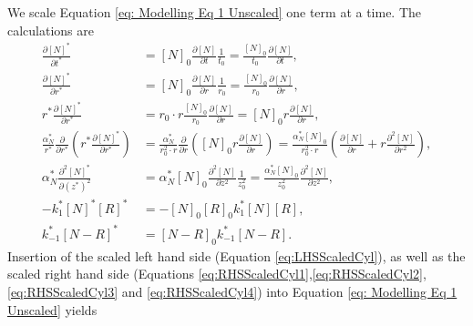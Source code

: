 \documentclass{article}
\begin{document}
We scale Equation \eqref{eq: Modelling Eq 1 Unscaled} one term at a time. The calculations are
\begin{align}
    \frac{\partial [N]^*}{\partial t^*} &= [N]_0 \frac{\partial [N]}{\partial t} \frac{1}{ t_0} = \frac{[N]_0}{ t_0} \frac{\partial [N]}{\partial t}, \label{eq:LHSScaledCyl}\\
    \frac{\partial [N]^*}{\partial r^*} &= [N]_0 \frac{\partial [N]}{\partial r} \frac{1}{r_0} = \frac{[N]_0}{r_0} \frac{\partial [N]}{\partial r}, \nonumber \\
    r^* \frac{\partial [N]^*}{\partial r^*} &= r_0 \cdot r \frac{[N]_0}{r_0} \frac{\partial [N]}{\partial r} = [N]_0 r \frac{\partial [N]}{\partial r}, \nonumber\\
    \frac{\alpha_N^*}{r^*} \frac{\partial}{\partial r^*} \left( r^* \frac{\partial [N]^*}{\partial r^*} \right) &= \frac{\alpha_N^*}{r_0^2 \cdot r} \frac{\partial}{\partial r} \left( [N]_0 r \frac{\partial [N]}{\partial r} \right) = \frac{\alpha_N^* [N]_0}{r_0^2 \cdot r} \left(\frac{\partial [N]}{\partial r} +  r \frac{\partial^2 [N]}{\partial r^2} \right),\label{eq:RHSScaledCyl1}\\
    \alpha_N^* \frac{\partial^2 [N]^*}{\partial (z^*)^2}  &= \alpha_N^* [N]_0 \frac{\partial^2 [N]}{\partial z^2} \frac{1}{z_0^2} =  \frac{\alpha_N^* [N]_0}{z_0^2}  \frac{\partial^2 [N]}{\partial z^2}, \label{eq:RHSScaledCyl2} \\
    -k_1^* [N]^* [R]^* &= - [N]_0 [R]_0 k_1^* [N] [R],\label{eq:RHSScaledCyl3} \\
    k_{-1}^* [N-R]^* &= [N-R]_0 k_{-1}^* [N-R]. \label{eq:RHSScaledCyl4}
\end{align}
Insertion of the scaled left hand side (Equation \eqref{eq:LHSScaledCyl}), as well as the scaled right hand side (Equations \eqref{eq:RHSScaledCyl1},\eqref{eq:RHSScaledCyl2},\eqref{eq:RHSScaledCyl3} and \eqref{eq:RHSScaledCyl4}) into Equation \eqref{eq: Modelling Eq 1 Unscaled} yields
\end{document}
